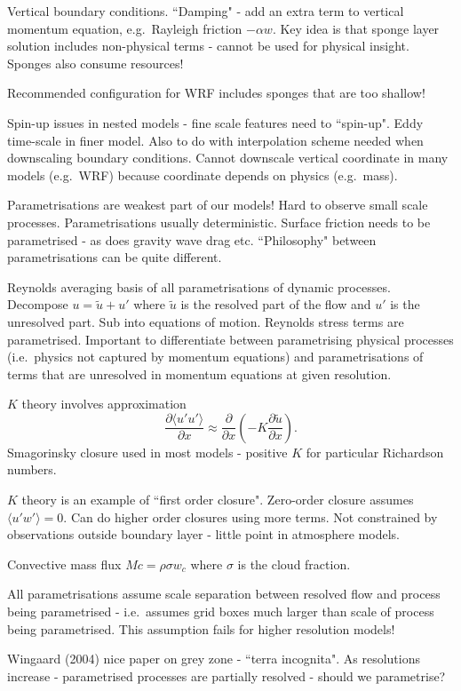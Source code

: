 \documentclass[12pt]{article}
\begin{document}
Vertical boundary conditions. ``Damping" - add an extra term to vertical momentum equation, e.g.~Rayleigh friction $-\alpha w$. Key idea is that sponge layer solution includes non-physical terms - cannot be used for physical insight. Sponges also consume resources!

Recommended configuration for WRF includes sponges that are too shallow! 

Spin-up issues in nested models - fine scale features need to ``spin-up". Eddy time-scale in finer model. Also to do with interpolation scheme needed when downscaling boundary conditions. Cannot downscale vertical coordinate in many models (e.g.~WRF) because coordinate depends on physics (e.g.~mass). 

Parametrisations are weakest part of our models! Hard to observe small scale processes. Parametrisations usually deterministic. Surface friction needs to be parametrised - as does gravity wave drag etc. ``Philosophy" between parametrisations can be quite different. 

Reynolds averaging basis of all parametrisations of dynamic processes. Decompose $u=\tilde{u}+u'$ where $\tilde{u}$ is the resolved part of the flow and $u'$ is the unresolved part. Sub into equations of motion. Reynolds stress terms are parametrised. Important to differentiate between parametrising physical processes (i.e.~physics not captured by momentum equations) and parametrisations of terms that are unresolved in momentum equations at given resolution.

$K$ theory involves approximation
$$\frac{\partial \langle u' u' \rangle }{\partial x} \approx \frac{\partial }{\partial x}\left(-K \frac{\partial \tilde{u}}{\partial x} \right).$$
Smagorinsky closure used in most models - positive $K$ for particular Richardson numbers. 

$K$ theory is an example of ``first order closure". Zero-order closure assumes $\langle u' w' \rangle =0.$ Can do higher order closures using more terms. Not constrained by observations outside boundary layer - little point in atmosphere models. 

Convective mass flux $Mc = \rho \sigma w_c$ where $\sigma$ is the cloud fraction.

All parametrisations assume scale separation between resolved flow and process being parametrised - i.e.~assumes grid boxes much larger than scale of process being parametrised. This assumption fails for higher resolution models! 

Wingaard (2004) nice paper on grey zone - ``terra incognita". As resolutions increase - parametrised processes are partially resolved - should we parametrise? 
\end{document}
